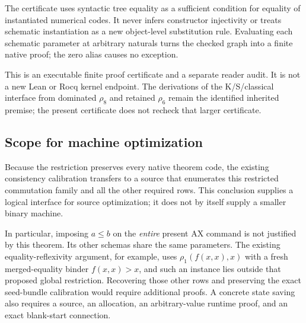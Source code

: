The certificate uses syntactic tree equality as a sufficient condition
for equality of instantiated numerical codes.  It never infers
constructor injectivity or treats schematic instantiation as a new
object-level substitution rule.  Evaluating each schematic parameter at
arbitrary naturals turns the checked graph into a finite native proof;
the zero alias causes no exception.

This is an executable finite proof certificate and a separate reader
audit.  It is not a new Lean or Rocq kernel endpoint.  The derivations of
the K/S/classical interface from dominated $\rho_8$ and retained $\rho_6$ remain the identified
inherited premise; the present certificate does not recheck that larger
certificate.

\subsection{Scope for machine optimization}

Because the restriction preserves every native theorem code, the
existing consistency calibration transfers to a source that enumerates
this restricted commutation family and all the other required rows.
This conclusion supplies a logical interface for source optimization;
it does not by itself supply a smaller binary machine.

In particular, imposing $a\le b$ on the \emph{entire} present AX command
is not justified by this theorem.  Its other schemas share the same
parameters.  The existing equality-reflexivity argument, for example,
uses $\rho_1(f(x,x),x)$ with a fresh merged-equality binder
$f(x,x)>x$, and such an instance lies outside that proposed global
restriction.  Recovering those other rows and preserving the exact
seed-bundle calibration would require additional proofs.  A concrete
state saving also requires a source, an allocation, an arbitrary-value
runtime proof, and an exact blank-start connection.
